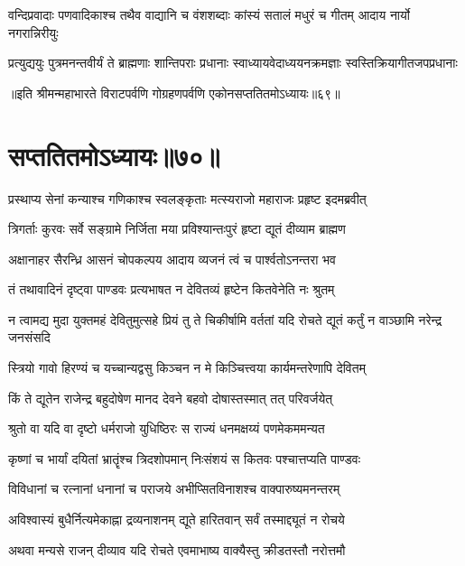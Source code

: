 \fourlineindentedshloka
{वन्दिप्रवादाः पणवादिकाश्च}
{तथैव वाद्यानि च वंशशब्दाः}
{कांस्यं सतालं मधुरं च गीतम्}
{आदाय नार्यो नगरान्निरीयुः}


\fourlineindentedshloka
{प्रत्युद्ययुः पुत्रमनन्तवीर्यं}
{ते ब्राह्मणाः शान्तिपराः प्रधानाः}
{स्वाध्यायवेदाध्ययनक्रमज्ञाः}
{स्वस्तिक्रियागीतजपप्रधानाः}

॥इति श्रीमन्महाभारते विराटपर्वणि गोग्रहणपर्वणि एकोनसप्ततितमोऽध्यायः॥६९॥

\chapter{सप्ततितमोऽध्यायः॥७०॥}

\twolineshloka
{प्रस्थाप्य सेनां कन्याश्च गणिकाश्च स्वलङ्कृताः}
{मत्स्यराजो महाराजः प्रहृष्ट इदमब्रवीत्}


\twolineshloka
{त्रिगर्ताः कुरवः सर्वे सङ्ग्रामे निर्जिता मया}
{प्रविश्यान्तःपुरं हृष्टा द्यूतं दीव्याम ब्राह्मण}


\twolineshloka
{अक्षानाहर सैरन्ध्रि आसनं चोपकल्पय}
{आदाय व्यजनं त्वं च पार्श्वतोऽनन्तरा भव}


\twolineshloka
{तं तथावादिनं दृष्ट्वा पाण्डवः प्रत्यभाषत}
{न देवितव्यं हृष्टेन कितवेनेति नः श्रुतम्}


\threelineshloka
{न त्वामद्य मुदा युक्तमहं देवितुमुत्सहे}
{प्रियं तु ते चिकीर्षामि वर्ततां यदि रोचते}
{द्यूतं कर्तुं न वाञ्छामि नरेन्द्र जनसंसदि}




\twolineshloka
{स्त्रियो गावो हिरण्यं च यच्चान्यद्वसु किञ्चन}
{न मे किञ्चित्त्वया कार्यमन्तरेणापि देवितम्}




\twolineshloka
{किं ते द्यूतेन राजेन्द्र बहुदोषेण मानद}
{देवने बहवो दोषास्तस्मात् तत् परिवर्जयेत्}


\twolineshloka
{श्रुतो वा यदि वा दृष्टो धर्मराजो युधिष्ठिरः}
{स राज्यं धनमक्षय्यं पणमेकममन्यत}


\twolineshloka
{कृष्णां च भार्यां दयितां भ्रातॄंश्च त्रिदशोपमान्}
{निःसंशयं स कितवः पश्चात्तप्यति पाण्डवः}


\twolineshloka
{विविधानां च रत्नानां धनानां च पराजये}
{अभीप्सितविनाशश्च वाक्पारुष्यमनन्तरम्}


\twolineshloka
{अविश्वास्यं बुधैर्नित्यमेकाह्ना द्रव्यनाशनम्}
{द्यूते हारितवान् सर्वं तस्माद्द्यूतं न रोचये}


\twolineshloka
{अथवा मन्यसे राजन् दीव्याव यदि रोचते}
{एवमाभाष्य वाक्यैस्तु क्रीडतस्तौ नरोत्तमौ}


